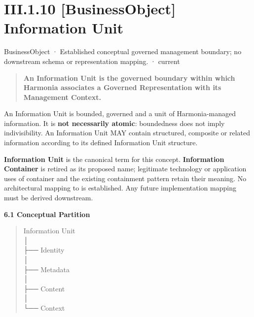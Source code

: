 \section*{III.1.10 [BusinessObject] Information Unit}
\label{navigation:III.1.10}

\label{element:10284034c8534b639284386b064f2c54}
{\small BusinessObject · Established conceptual governed management boundary; no downstream schema or representation mapping. · current}\par

\begin{quote}


\textbf{An Information Unit is the governed boundary within which Harmonia associates a Governed Representation with its Management Context.}



\end{quote}


An Information Unit is bounded, governed and a unit of Harmonia-managed
information. It is \textbf{not necessarily atomic}: boundedness does not imply
indivisibility. An Information Unit MAY contain structured, composite or related
information according to its defined Information Unit structure.



\textbf{Information Unit} is the canonical term for this concept. \textbf{Information
Container} is retired as its proposed name; legitimate technology or application
uses of container and the existing containment pattern retain their meaning.
No architectural mapping to \texttt{} is established. Any future
implementation mapping must be derived downstream.



\par\medskip\textbf{6.1 Conceptual Partition}\par


\begin{quote}\small\ttfamily
Information Unit\\
│\\
├── Identity\\
│\\
├── Metadata\\
│\\
├── Content\\
│\\
└── Context\\

\end{quote}


